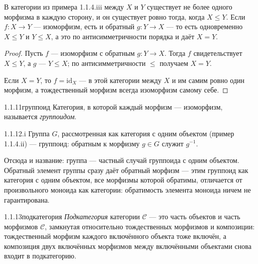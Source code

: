 \begin{intuition}
В категории из примера 1.1.4.iii между $X$ и $Y$ существует не более одного морфизма в
каждую сторону, и он существует ровно тогда, когда $X \le Y$. Если $f \colon X \to Y$ —
изоморфизм, есть и обратный $g \colon Y \to X$ — то есть одновременно $X \le Y$ и $Y \le
X$, а это по антисимметричности порядка и даёт $X=Y$.
\end{intuition}

\begin{proof}
\prooflabel{$\Rightarrow$} Пусть $f$ — изоморфизм с обратным $g \colon Y \to X$. Тогда
$f$ свидетельствует $X \le Y$, а $g$ — $Y \le X$; по антисимметричности $\le$ получаем
$X=Y$.

\prooflabel{$\Leftarrow$} Если $X=Y$, то $f = \mathrm{id}_X$ — в этой категории между
$X$ и им самим ровно один морфизм, а тождественный морфизм всегда изоморфизм самому
себе.
\end{proof}

\begin{definition}{1.1.11}{группоид}
Категория, в которой каждый морфизм — изоморфизм, называется \emph{группоидом}.
\end{definition}

\begin{example}{1.1.12.i}{}
Группа $G$, рассмотренная как категория с одним объектом (пример 1.1.4.ii) —
группоид: обратным к морфизму $g \in G$ служит $g^{-1}$.
\end{example}

\begin{intuition}
Отсюда и название: группа — частный случай группоида с одним объектом. Обратный
элемент группы сразу даёт обратный морфизм — этим группоид как категория с одним
объектом, все морфизмы которой обратимы, отличается от произвольного моноида как
категории: обратимость элемента моноида ничем не гарантирована.
\end{intuition}

\begin{definition}{1.1.13}{подкатегория}
\emph{Подкатегория} категории $\mathcal{C}$ — это часть объектов и часть морфизмов
$\mathcal{C}$, замкнутая относительно тождественных морфизмов и композиции:
тождественный морфизм каждого включённого объекта тоже включён, а композиция двух
включённых морфизмов между включёнными объектами снова входит в подкатегорию.
\end{definition}

